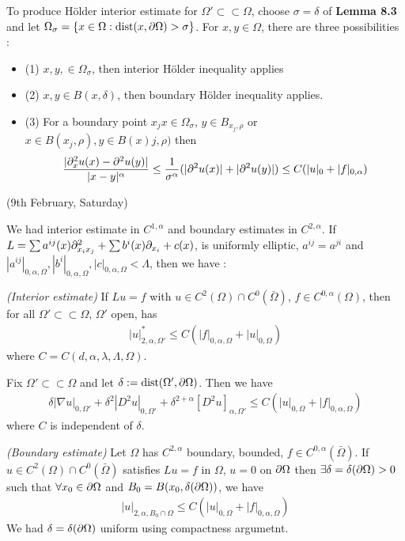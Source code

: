 \documentclass[12pt,a4paper]{article}
\renewenvironment{i}
{\begin{itemize} 
	}%
	{\end{itemize}
}
\begin{document}
To produce H\"older interior estimate for $\Omega' \subset\subset \Omega$, choose $\sigma = \delta$ of \textbf{Lemma 8.3}  and let $\Omega_{\sigma} = \{x\in \Omega : \text{dist}(x, \partial \Omega)>\sigma\}$. For $x, y\in \Omega$, there are three possibilities :
\begin{i}
\item[(1)] $x,y,\in \Omega_{\sigma}$, then interior H\"older inequality applies
\item[(2)] $x,y\in B(x,\delta)$, then boundary H\"older inequality applies.
\item[(3)] For a boundary point $x_j$$x\in \Omega_{\sigma}$, $y\in B_{x_j, \rho}$ or $x\in B(x_j, \rho), y\in B(x)j, \rho)$ then
\begin{align*}
\frac{|\partial_x^2 u(x) - \partial^2_{}u(y)|}{|x-y|^{\alpha}} \leq \frac{1}{\sigma^{\alpha}}(|\partial^2 u(x)|+ |\partial^2 u(y)|) \leq C(|u|_0 + |f|_{0, \alpha})
\end{align*} 
\end{i}
\s

\newday

(9th February, Saturday)
\s

We had interior estimate in $C^{1, \alpha}$ and boundary estimates in $C^{2, \alpha}$. If $L = \sum a^{ij}(x) \partial^2_{x_i x_j} + \sum b^i(x) \partial_{x_i} + c(x)$, is uniformly elliptic, $a^{ij} =a^{ji}$ and $|a^{ij}|_{0, \alpha, \Omega}, |b^i|_{0, \alpha, \Omega}, |c|_{0, \alpha, \Omega}< \Lambda$, then we have :
\s

 \emph{(Interior estimate)} If $Lu =f$ with $u\in C^2(\Omega)\cap C^0 (\bar{\Omega})$, $f\in C^{0, \alpha}(\Omega)$, then for all $\Omega'\subset \subset \Omega$, $\Omega'$ open, has
\begin{align*}
|u|^*_{2, \alpha, \Omega'} \leq C(|f|_{0, \alpha, \Omega} + |u|_{0, \Omega})
\end{align*}
where $C =C(d, \alpha, \lambda, \Lambda, \Omega)$.
\s

\corr Fix $\Omega'\subset\subset \Omega$ and let $\delta := \text{dist}(\Omega', \partial \Omega)$. Then we have
\begin{align*}
\delta|\nabla u|_{0, \Omega'} + \delta^2 |D^2 u|_{0, \Omega'} + \delta^{2+ \alpha}[D^2 u]_{\alpha, \Omega'} \leq C (|u|_{0, \Omega} + |f|_{0, \alpha, \Omega})
\end{align*}
where $C$ is independent of $\delta$.
\s

 \emph{(Boundary estimate)} Let $\Omega$ has $C^{2, \alpha}$ boundary, bounded, $f\in C^{0, \alpha}(\bar{\Omega})$. If $u\in C^{2}(\Omega) \cap C^0(\bar{\Omega})$ satisfies $Lu =f$ in $\Omega$, $u= 0$ on $\partial \Omega$ then $\exists\delta = \delta(\partial \Omega) >0$ such that $\forall x_0 \in \partial \Omega$ and $B_0 = B(x_0, \delta(\partial \Omega))$, we have
\begin{align*}
|u|_{2, \alpha, B_0 \cap \Omega} \leq C(|u|_{0, \Omega} + |f|_{0, \alpha, \Omega})
\end{align*}
We had $\delta = \delta(\partial \Omega)$ uniform using compactness argumetnt.
\s
\end{document}
